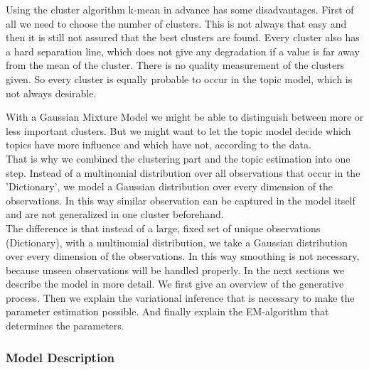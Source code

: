\documentclass[11pt,a4paper]{article}
\begin{document}
Using the cluster algorithm k-mean in advance has some disadvantages. First of all we need to choose the number of clusters. This is not always that easy and then it is still not assured that the best clusters are found. Every cluster also has a hard separation line, which does not give any degradation if a value is far away from the mean of the cluster. There is no quality measurement of the clusters given. So every cluster is equally probable to occur in the topic model, which is not always desirable.

With a Gaussian Mixture Model we might be able to distinguish between more or less important clusters. But we might want to let the topic model decide which topics have more influence and which have not, according to the data.\\
That is why we combined the clustering part and the topic estimation into one step. Instead of a multinomial distribution over all observations that occur in the 'Dictionary', we model a Gaussian distribution over every dimension of the observations. In this way similar observation can be captured in the model itself and are not generalized in one cluster beforehand.\\
The difference is that instead of a large, fixed set of unique observations (Dictionary), with a multinomial distribution, we take a Gaussian distribution over every dimension of the observations. In this way smoothing is not necessary, because unseen observations will be handled properly.
In the next sections we describe the model in more detail. We first give an overview of the generative process. Then we explain the variational inference that is necessary to make the parameter estimation possible. And finally explain the EM-algorithm that determines the parameters.


  \subsubsection{Model Description}
  
\end{document}
